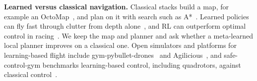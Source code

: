 \textbf{Learned versus classical navigation.} Classical stacks build a map, for example an OctoMap~\cite{hornung2013octomap}, and plan on it with search such as A*~\cite{hart1968astar}. Learned policies can fly fast through clutter from depth alone~\cite{loquercio2021wild}, and RL can outperform optimal control in racing~\cite{song2023reaching}. We keep the map and planner and ask whether a meta-learned local planner improves on a classical one. Open simulators and platforms for learning-based flight include gym-pybullet-drones~\cite{panerati2021pybullet} and Agilicious~\cite{foehn2022agilicious}, and safe-control-gym benchmarks learning-based control, including quadrotors, against classical control~\cite{yuan2022safecontrolgym}.
